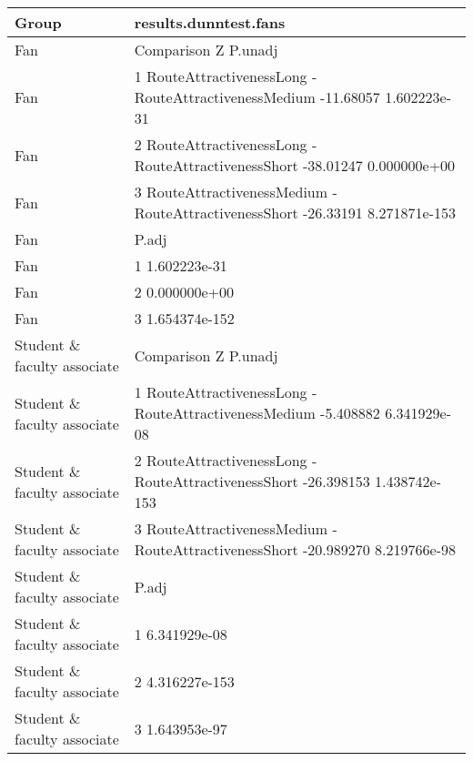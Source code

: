 \begin{tabular}{ll}
  \hline
Group & results.dunntest.fans \\ 
  \hline
Fan &                                             Comparison         Z       P.unadj \\ 
  Fan & 1  RouteAttractivenessLong - RouteAttractivenessMedium -11.68057  1.602223e-31 \\ 
  Fan & 2   RouteAttractivenessLong - RouteAttractivenessShort -38.01247  0.000000e+00 \\ 
  Fan & 3 RouteAttractivenessMedium - RouteAttractivenessShort -26.33191 8.271871e-153 \\ 
  Fan &           P.adj \\ 
  Fan & 1  1.602223e-31 \\ 
  Fan & 2  0.000000e+00 \\ 
  Fan & 3 1.654374e-152 \\ 
  Student \& faculty associate &                                             Comparison          Z       P.unadj \\ 
  Student \& faculty associate & 1  RouteAttractivenessLong - RouteAttractivenessMedium  -5.408882  6.341929e-08 \\ 
  Student \& faculty associate & 2   RouteAttractivenessLong - RouteAttractivenessShort -26.398153 1.438742e-153 \\ 
  Student \& faculty associate & 3 RouteAttractivenessMedium - RouteAttractivenessShort -20.989270  8.219766e-98 \\ 
  Student \& faculty associate &           P.adj \\ 
  Student \& faculty associate & 1  6.341929e-08 \\ 
  Student \& faculty associate & 2 4.316227e-153 \\ 
  Student \& faculty associate & 3  1.643953e-97 \\ 
   \hline
\end{tabular}
